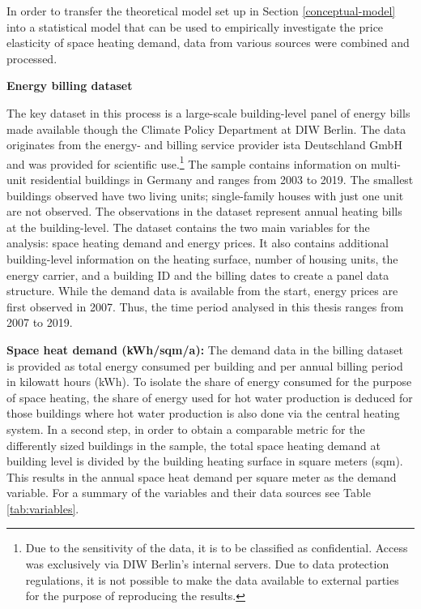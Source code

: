 \documentclass[12pt,twoside]{reedthesis}
\begin{document}
In order to transfer the theoretical model set up in Section \ref{conceptual-model} into a statistical model that can be used to empirically investigate the price elasticity of space heating demand, data from various sources were combined and processed.

\textbf{Energy billing dataset}

The key dataset in this process is a large-scale building-level panel of energy bills made available though the Climate Policy Department at DIW Berlin. The data originates from the energy- and billing service provider ista Deutschland GmbH and was provided for scientific use.\footnote{Due to the sensitivity of the data, it is to be classified as confidential. Access was exclusively via DIW Berlin's internal servers. Due to data protection regulations, it is not possible to make the data available to external parties for the purpose of reproducing the results.} The sample contains information on multi-unit residential buildings in Germany and ranges from 2003 to 2019. The smallest buildings observed have two living units; single-family houses with just one unit are not observed. The observations in the dataset represent annual heating bills at the building-level. The dataset contains the two main variables for the analysis: space heating demand and energy prices. It also contains additional building-level information on the heating surface, number of housing units, the energy carrier, and a building ID and the billing dates to create a panel data structure. While the demand data is available from the start, energy prices are first observed in 2007. Thus, the time period analysed in this thesis ranges from 2007 to 2019.

\textbf{Space heat demand (kWh/sqm/a):} The demand data in the billing dataset is provided as total energy consumed per building and per annual billing period in kilowatt hours (kWh). To isolate the share of energy consumed for the purpose of space heating, the share of energy used for hot water production is deduced for those buildings where hot water production is also done via the central heating system. In a second step, in order to obtain a comparable metric for the differently sized buildings in the sample, the total space heating demand at building level is divided by the building heating surface in square meters (sqm). This results in the annual space heat demand per square meter as the demand variable. For a summary of the variables and their data sources see Table \ref{tab:variables}.
\end{document}
